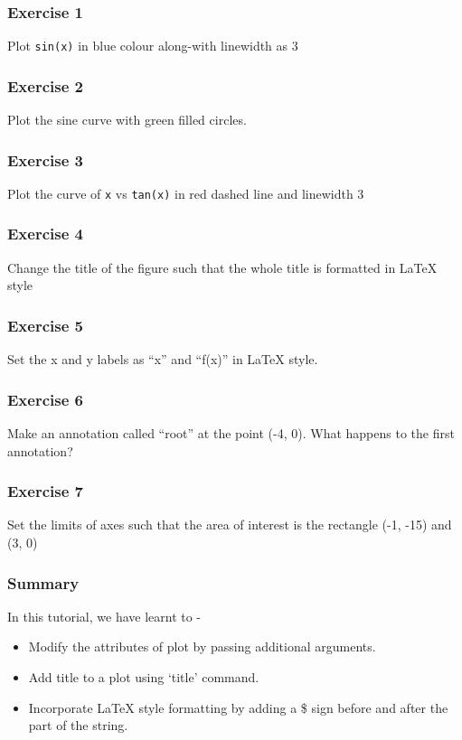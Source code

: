 \documentclass[17pt,compress]{beamer}
\begin{document}
\begin{frame}
\frametitle{Exercise 1}
\label{sec-4}
Plot \texttt{sin(x)} in blue colour along-with linewidth as 3
\end{frame}
\begin{frame}
\frametitle{Exercise 2}
\label{sec-5}
Plot the sine curve with green filled circles.
\end{frame}
\begin{frame}
\frametitle{Exercise 3}
\label{sec-6}
Plot the curve of \texttt{x} vs \texttt{tan(x)} in red dashed line and linewidth 3
\end{frame}
\begin{frame}
\frametitle{Exercise 4}
\label{sec-7}
Change the title of the figure such that the whole title is
formatted in \LaTeX{}  style
\end{frame}
\begin{frame}
\frametitle{Exercise 5}
\label{sec-8}
Set the x and y labels as ``x'' and ``f(x)'' in \LaTeX{} style.
\end{frame}
\begin{frame}
\frametitle{Exercise 6}
\label{sec-9}
Make an annotation called ``root'' at the point (-4, 0). What happens
to the first annotation?
\end{frame}
\begin{frame}
\frametitle{Exercise 7}
\label{sec-10}
Set the limits of axes such that the area of interest is the
rectangle (-1, -15) and (3, 0)
\end{frame}
\begin{frame}
\frametitle{Summary}
\label{sec-11.1}
In this tutorial, we have learnt to -
\begin{itemize}
\item Modify the attributes of plot by passing additional arguments.
\item Add title to a plot using `title' command.
\item Incorporate \LaTeX{} style formatting by adding a \$ sign before and after the part of the string.
\end{itemize}
\end{frame}
\end{document}
